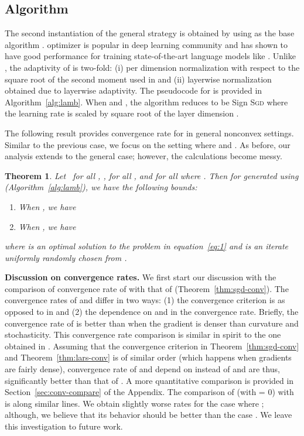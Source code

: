 \documentclass{article} \usepackage{iclr2020_conference,times}
\def\eqref#1{equation~\ref{#1}}
\newtheorem{theorem}{Theorem}
\newcommand{\sgd}{\textsc{Sgd}\xspace}
\begin{document}
\subsection{ Algorithm}
\label{Subsection:lamb}

The second instantiation of the general strategy is obtained by using  as the base algorithm .  optimizer is popular in deep learning community and has shown to have good performance for training state-of-the-art language models like . Unlike , the adaptivity of  is two-fold: (i) per dimension normalization with respect to the square root of the second moment used in  and (ii) layerwise normalization  obtained due to layerwise adaptivity. The pseudocode for  is provided in Algorithm~\ref{alg:lamb}. When  and , the algorithm reduces to be Sign \sgd where the learning rate is scaled by square root of the layer dimension \citep{signsgd}.

The following result provides convergence rate for  in general nonconvex settings. Similar to the previous case, we focus on the setting where  and . As before, our analysis extends to the general case; however, the calculations become messy.

\begin{theorem}
\label{thm:lamb-conv}
Let  \ for all , ,  for all , and  for all  where . Then for  generated using  (Algorithm~\ref{alg:lamb}), we have the following bounds:
\begin{enumerate}
    \item When , we have
    

    \item When , we have
    

\end{enumerate}
where  is an optimal solution to the problem in \eqref{eq:1} and  is an iterate uniformly randomly chosen from .
\end{theorem}

{\bf Discussion on convergence rates.} We first start our discussion with the comparison of convergence rate of  with that of  (Theorem~\ref{thm:sgd-conv}). The convergence rates of  and  differ in two ways: (1) the convergence criterion is  as opposed to  in  and (2) the dependence on  and  in the convergence rate. Briefly, the convergence rate of  is better than  when the gradient is denser than curvature and stochasticity. This convergence rate comparison is similar in spirit to the one obtained in \citep{signsgd}. Assuming that the convergence criterion in Theorem~\ref{thm:sgd-conv} and Theorem~\ref{thm:lars-conv} is of similar order (which happens when gradients are fairly dense), convergence rate of  and  depend on  instead of  and are thus, significantly better than that of . A more quantitative comparison is provided in Section~\ref{sec:conv-compare} of the Appendix. The comparison of  (with  = 0) with  is along similar lines. We obtain slightly worse rates for the case where ; although, we believe that its behavior should be better than the case . We leave this investigation to future work.  
\end{document}
